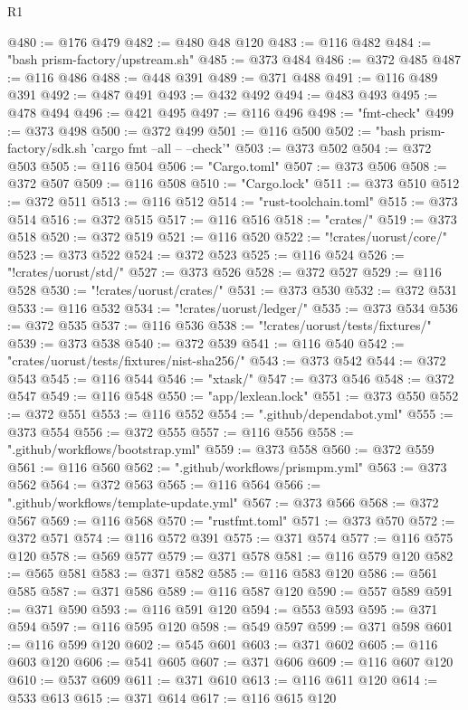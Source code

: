\begin{lexlean}{R1}
\begin{coremodule}
@480 := @176 @479
@482 := @480 @48 @120
@483 := @116 @482
@484 := "bash prism-factory/upstream.sh"
@485 := @373 @484
@486 := @372 @485
@487 := @116 @486
@488 := @448 @391
@489 := @371 @488
@491 := @116 @489 @391
@492 := @487 @491
@493 := @432 @492
@494 := @483 @493
@495 := @478 @494
@496 := @421 @495
@497 := @116 @496
@498 := "fmt-check"
@499 := @373 @498
@500 := @372 @499
@501 := @116 @500
@502 := "bash prism-factory/sdk.sh 'cargo fmt --all -- --check'"
@503 := @373 @502
@504 := @372 @503
@505 := @116 @504
@506 := "Cargo.toml"
@507 := @373 @506
@508 := @372 @507
@509 := @116 @508
@510 := "Cargo.lock"
@511 := @373 @510
@512 := @372 @511
@513 := @116 @512
@514 := "rust-toolchain.toml"
@515 := @373 @514
@516 := @372 @515
@517 := @116 @516
@518 := "crates/"
@519 := @373 @518
@520 := @372 @519
@521 := @116 @520
@522 := "!crates/uorust/core/"
@523 := @373 @522
@524 := @372 @523
@525 := @116 @524
@526 := "!crates/uorust/std/"
@527 := @373 @526
@528 := @372 @527
@529 := @116 @528
@530 := "!crates/uorust/crates/"
@531 := @373 @530
@532 := @372 @531
@533 := @116 @532
@534 := "!crates/uorust/ledger/"
@535 := @373 @534
@536 := @372 @535
@537 := @116 @536
@538 := "!crates/uorust/tests/fixtures/"
@539 := @373 @538
@540 := @372 @539
@541 := @116 @540
@542 := "crates/uorust/tests/fixtures/nist-sha256/"
@543 := @373 @542
@544 := @372 @543
@545 := @116 @544
@546 := "xtask/"
@547 := @373 @546
@548 := @372 @547
@549 := @116 @548
@550 := "app/lexlean.lock"
@551 := @373 @550
@552 := @372 @551
@553 := @116 @552
@554 := ".github/dependabot.yml"
@555 := @373 @554
@556 := @372 @555
@557 := @116 @556
@558 := ".github/workflows/bootstrap.yml"
@559 := @373 @558
@560 := @372 @559
@561 := @116 @560
@562 := ".github/workflows/prismpm.yml"
@563 := @373 @562
@564 := @372 @563
@565 := @116 @564
@566 := ".github/workflows/template-update.yml"
@567 := @373 @566
@568 := @372 @567
@569 := @116 @568
@570 := "rustfmt.toml"
@571 := @373 @570
@572 := @372 @571
@574 := @116 @572 @391
@575 := @371 @574
@577 := @116 @575 @120
@578 := @569 @577
@579 := @371 @578
@581 := @116 @579 @120
@582 := @565 @581
@583 := @371 @582
@585 := @116 @583 @120
@586 := @561 @585
@587 := @371 @586
@589 := @116 @587 @120
@590 := @557 @589
@591 := @371 @590
@593 := @116 @591 @120
@594 := @553 @593
@595 := @371 @594
@597 := @116 @595 @120
@598 := @549 @597
@599 := @371 @598
@601 := @116 @599 @120
@602 := @545 @601
@603 := @371 @602
@605 := @116 @603 @120
@606 := @541 @605
@607 := @371 @606
@609 := @116 @607 @120
@610 := @537 @609
@611 := @371 @610
@613 := @116 @611 @120
@614 := @533 @613
@615 := @371 @614
@617 := @116 @615 @120

\end{coremodule}
\end{lexlean}
